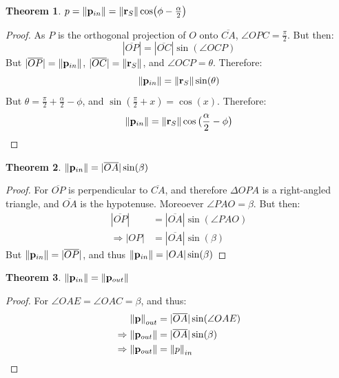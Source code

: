 \documentclass{article}
\theoremstyle{mystyle}
\newtheorem{theorem}{Theorem}[section]
\begin{document}
\begin{theorem}
\label{theorem:impact_parameter_p_closed_form_solution}
$p = \norm{\mathbf{p}_{in}} = \norm{\mathbf{r}_{S}}\cos(\phi - \frac{\alpha}{2})$
\end{theorem}
\begin{proof}
As $P$ is the orthogonal projection of $O$ onto $\overline{CA}$, $\angle OPC = \frac{\pi}{2}$. But then: \begin{equation}
    |\overline{OP}| = |\overline{OC}|\sin(\angle OCP)
\end{equation}
But $|\overline{OP}| = \norm{\mathbf{p}_{in}}$, $|\overline{OC}| = \norm{\mathbf{r}_{S}}$, and $\angle OCP = \theta$. Therefore:
\begin{equation}
    \norm{\mathbf{p}_{in}} = \norm{\mathbf{r}_{S}}\sin(\theta)
\end{equation}
But $\theta = \frac{\pi}{2} + \frac{\alpha}{2} - \phi$, and $\sin(\frac{\pi}{2}+x) = \cos(x)$. Therefore:
\begin{equation}
    \norm{\mathbf{p}_{in}} = \norm{\mathbf{r}_{S}}\cos\big(\frac{\alpha}{2} - \phi\big)
\end{equation}
\end{proof}

\begin{theorem}
$\norm{\mathbf{p}_{in}} = |\overline{OA}|\sin(\beta)$
\end{theorem}
\begin{proof}
For $\overline{OP}$ is perpendicular to $\overline{CA}$, and therefore $\Delta OPA$ is a right-angled triangle, and $\overline{OA}$ is the hypotenuse. Moreoever $\angle PAO = \beta$. But then:
\begin{align}
|\overline{OP}| &= |\overline{OA}|\sin(\angle PAO)\\
\Rightarrow |OP| &= |\overline{OA}|\sin(\beta)
\end{align}
But $\norm{\mathbf{p}_{in}} = |\overline{OP}|$, and thus $\norm{\mathbf{p}_{in}} = |OA|\sin(\beta)$
\end{proof}

\begin{theorem}
\label{theorem:p_out_equals_p_in}
$\norm{\mathbf{p}_{in}} = \norm{\mathbf{p}_{out}}$
\end{theorem}
\begin{proof}
For $\angle OAE = \angle OAC = \beta$, and thus:
\begin{align}
    \norm{\mathbf{p}}_{out} &= |\overline{OA}|\sin(\angle OAE)\\ 
    \Rightarrow \norm{\mathbf{p}_{out}} &= |\overline{OA}|\sin(\beta)\\
    \Rightarrow \norm{\mathbf{p}_{out}} &= \norm{p}_{in}
\end{align}
\end{proof}
\end{document}
